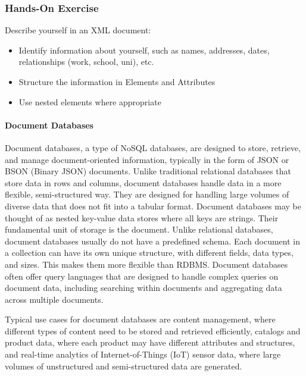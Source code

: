 \begin{tcolorbox}[colback=code]
\subsubsection*{Hands-On Exercise} 

Describe yourself in an XML document:
\begin{itemize}
	\item Identify information about yourself, such as names, addresses, dates, relationships (work, school, uni), etc.
	\item Structure the information in Elements and Attributes 
	\item Use nested elements where appropriate
\end{itemize}
\end{tcolorbox}

\paragraph*{Document Databases}

Document databases, a type of NoSQL databases, are designed to store, retrieve, and manage document-oriented information, typically in the form of JSON or BSON (Binary JSON) documents. Unlike traditional relational data\-bases that store data in rows and columns, document databases handle data in a more flexible, semi-structured way. They are designed for handling large volumes of diverse data that does not fit into a tabular format. Document databases may be thought of as nested key-value data stores where all keys are strings. Their fundamental unit of storage is the document. Unlike relational databases, document databases usually do not have a predefined schema. Each document in a collection can have its own unique structure, with different fields, data types, and sizes. This makes them more flexible than RDBMS. Document databases often offer query languages that are designed to handle complex queries on document data, including searching within documents and aggregating data across multiple documents. 

Typical use cases for document databases are content management, where different types of content need to be stored and retrieved efficiently, catalogs and product data, where each product may have different attributes and structures, and real-time analytics of Internet-of-Things (IoT) sensor data, where large volumes of unstructured and semi-structured data are generated.

